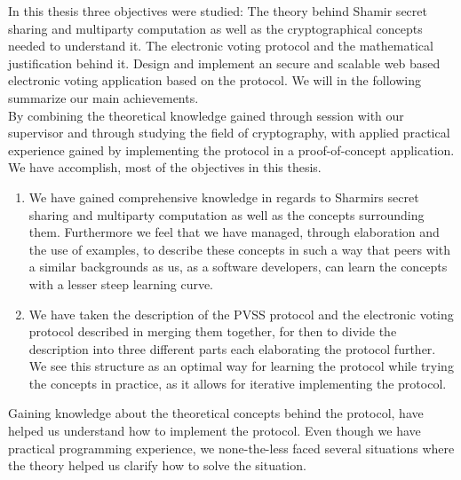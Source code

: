 In this thesis three objectives were studied: The theory behind Shamir secret sharing and multiparty computation as well as the cryptographical concepts needed to understand it. The electronic voting protocol and the mathematical justification behind it. Design and implement an secure and scalable web based electronic voting application based on the protocol. We will in the following summarize our main achievements. \\

\noindent 
By combining the theoretical knowledge gained through session with our supervisor and through studying the field of cryptography, with applied practical experience gained by implementing the protocol in a proof-of-concept application. We have accomplish, most of the objectives in this thesis.

\begin{enumerate}
    \item We have gained comprehensive knowledge in regards to Sharmirs secret sharing and multiparty computation as well as the concepts surrounding them. Furthermore we feel that we have managed, through elaboration and the use of examples, to describe these concepts in such a way that peers with a similar backgrounds as us, as a software developers, can learn the concepts with a lesser steep learning curve. 
    
    \item We have taken the description of the PVSS protocol and the electronic voting protocol described in \cite{Schoenmakers1999} merging them together, for then to divide the description into three different parts each elaborating the protocol further. We see this structure as an optimal way for learning the protocol while trying the concepts in practice, as it allows for iterative implementing the protocol. 
\end{enumerate}    


\noindent  
Gaining knowledge about the theoretical concepts behind the protocol, have helped us understand how to implement the protocol. Even though we have practical programming experience, we none-the-less faced several situations where the theory helped us clarify how to solve the situation.    
    
